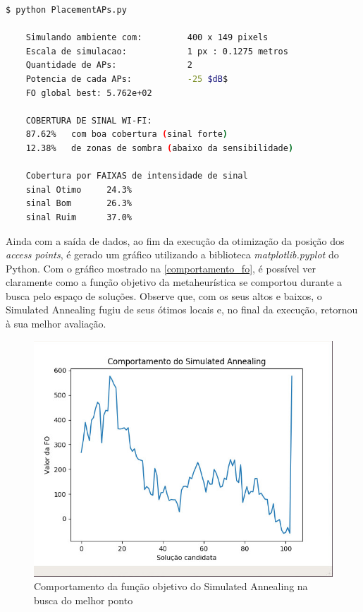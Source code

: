 \documentclass[
	12pt,				%
	twoside,			%
	a4paper,			%
	english,			%
	french,				%
	spanish,			%
	brazil				%
	]{abntex2}
\begin{document}
\begin{lstlisting}[language=bash]
    $ python PlacementAPs.py 

    Simulando ambiente com:         400 x 149 pixels
    Escala de simulacao:            1 px : 0.1275 metros
    Quantidade de APs:              2
    Potencia de cada APs:           -25 $dB$
    FO global best: 5.762e+02

    COBERTURA DE SINAL WI-FI:
    87.62%   com boa cobertura (sinal forte)
    12.38%   de zonas de sombra (abaixo da sensibilidade)

    Cobertura por FAIXAS de intensidade de sinal
    sinal Otimo     24.3%
    sinal Bom       26.3%
    sinal Ruim      37.0%

\end{lstlisting}

Ainda com a saída de dados, ao fim da execução da otimização da posição
dos \emph{access points}, é gerado um gráfico utilizando a biblioteca
\emph{matplotlib.pyplot} do Python. Com o gráfico mostrado na
\autoref{comportamento_fo}, é possível ver claramente como a função
objetivo da metaheurística se comportou durante a busca pelo espaço de
soluções. Observe que, com os seus altos e baixos, o Simulated Annealing
fugiu de seus ótimos locais e, no final da execução, retornou à sua
melhor avaliação.

\begin{figure}[ht]
    \caption{\label{comportamento_fo} Comportamento da função objetivo do Simulated Annealing na busca do melhor ponto}
    \begin{center}
        \includegraphics[scale=0.5]{imagens/comportamento-fo.jpg}
    \end{center}
\end{figure}
\end{document}
